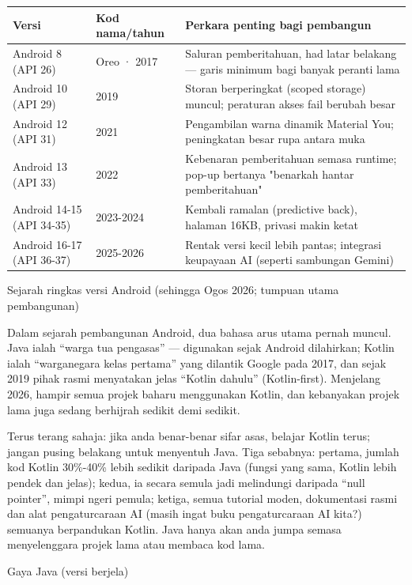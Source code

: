 \begin{center}
\begin{tabularx}{\linewidth}{|X|X|X|}
\hline
\textbf{Versi} & \textbf{Kod nama/tahun} & \textbf{Perkara penting bagi pembangun} \tabularnewline
\hline
Android 8 (API 26) & Oreo · 2017 & Saluran pemberitahuan, had latar belakang — garis minimum bagi banyak peranti lama \tabularnewline
Android 10 (API 29) & 2019 & Storan berperingkat (scoped storage) muncul; peraturan akses fail berubah besar \tabularnewline
Android 12 (API 31) & 2021 & Pengambilan warna dinamik Material You; peningkatan besar rupa antara muka \tabularnewline
Android 13 (API 33) & 2022 & Kebenaran pemberitahuan semasa runtime; pop-up bertanya "benarkah hantar pemberitahuan" \tabularnewline
Android 14-15 (API 34-35) & 2023-2024 & Kembali ramalan (predictive back), halaman 16KB, privasi makin ketat \tabularnewline
Android 16-17 (API 36-37) & 2025-2026 & Rentak versi kecil lebih pantas; integrasi keupayaan AI (seperti sambungan Gemini) \tabularnewline
\hline
\end{tabularx}
\end{center}

\begin{center}\small\color{gray}Sejarah ringkas versi Android (sehingga Ogos 2026; tumpuan utama pembangunan)\end{center}


Dalam sejarah pembangunan Android, dua bahasa arus utama pernah muncul. Java ialah “warga tua pengasas” — digunakan sejak Android dilahirkan; Kotlin ialah “warganegara kelas pertama” yang dilantik Google pada 2017, dan sejak 2019 pihak rasmi menyatakan jelas “Kotlin dahulu” (Kotlin-first). Menjelang 2026, hampir semua projek baharu menggunakan Kotlin, dan kebanyakan projek lama juga sedang berhijrah sedikit demi sedikit.

Terus terang sahaja: jika anda benar-benar sifar asas, belajar Kotlin terus; jangan pusing belakang untuk menyentuh Java. Tiga sebabnya: pertama, jumlah kod Kotlin 30\%-40\% lebih sedikit daripada Java (fungsi yang sama, Kotlin lebih pendek dan jelas); kedua, ia secara semula jadi melindungi daripada “null pointer”, mimpi ngeri pemula; ketiga, semua tutorial moden, dokumentasi rasmi dan alat pengaturcaraan AI (masih ingat buku pengaturcaraan AI kita?) semuanya berpandukan Kotlin. Java hanya akan anda jumpa semasa menyelenggara projek lama atau membaca kod lama.

Gaya Java (versi berjela)

